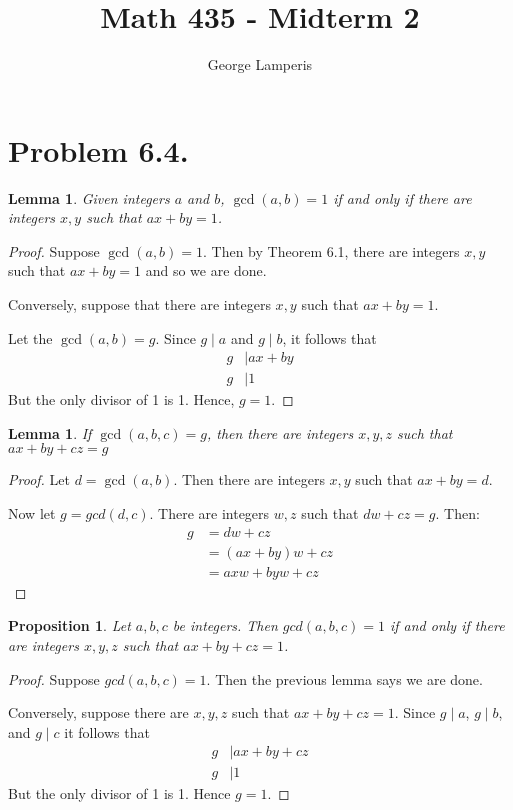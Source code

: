 \documentclass[letterpaper, 12pt, oneside]{memoir}
\title{Math 435 - Midterm 2}
\author{George Lamperis}
\date{}
\theoremstyle{mystyle}
\newtheorem{prop}[thm]{Proposition}
\newtheorem{lemma}[thm]{Lemma}
\begin{document}
\maketitle

\section{Problem 6.4.}

\begin{lemma}
    Given integers $a$ and $b$, $\gcd(a,b) = 1$ if and only if there are
    integers $x, y$ such that $ax + by = 1$.
\end{lemma}
\begin{proof}
    Suppose $\gcd(a,b) = 1$. Then by Theorem 6.1, there are integers $x,y$ such
    that $ax+by=1$ and so we are done.
    
    Conversely, suppose that there are integers $x,y$ such that $ax+by=1$. 
    
    Let the $\gcd(a,b)=g$. Since $g \mid a$ and $g \mid b$, it follows that
    \begin{align*}
        g & \mid ax+by \\
        g & \mid 1
    \end{align*}
    But the only divisor of 1 is 1. Hence, $g=1$.
\end{proof}
    

\begin{lemma}
    If $\gcd(a,b,c) = g$, then there are integers $x,y,z$ such that 
    $ax + by + cz = g$
\end{lemma}
\begin{proof}
    Let $d=\gcd(a,b)$. Then there are integers $x,y$ such that $ax+by=d$.
    
    Now let $g=gcd(d,c)$. There are integers $w,z$ such that $dw+cz=g$. Then:
    \begin{align*}
        g &= dw + cz \\
          &= (ax+by)w + cz \\
          &= axw + byw + cz
    \end{align*}
\end{proof}

\begin{prop}
    Let $a,b,c$ be integers. Then $gcd(a,b,c) = 1$ if and only if there are
    integers $x,y,z$ such that $ax+by+cz=1$.
\end{prop}
\begin{proof}
    Suppose $gcd(a,b,c) = 1$. Then the previous lemma says we are done.
    
    Conversely, suppose there are $x,y,z$ such that $ax+by+cz=1$. Since 
    $g \mid a$, $g \mid b$, and $g \mid c$ it follows that
    \begin{align*}
        g & \mid ax+by+cz \\
        g & \mid 1
    \end{align*}
    But the only divisor of 1 is 1. Hence $g=1$.
\end{proof}
\end{document}
